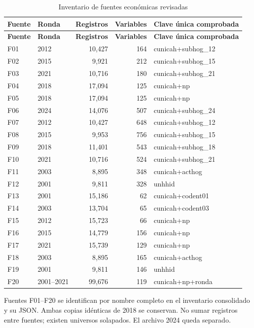 \begingroup\small\singlespacing
\setlength{\tabcolsep}{3pt}
\begin{longtable}{llrrp{4.4cm}}
\caption{Inventario de fuentes económicas revisadas}\label{tab:pensiones_fuentes}\\
\toprule \textbf{Fuente} & \textbf{Ronda} & \textbf{Registros} & \textbf{Variables} & \textbf{Clave única comprobada} \\
\midrule\endfirsthead
\toprule \textbf{Fuente} & \textbf{Ronda} & \textbf{Registros} & \textbf{Variables} & \textbf{Clave única comprobada} \\
\midrule\endhead\bottomrule\endfoot
F01 & 2012 & 10,427 & 164 & cunicah+subhog\_12 \\
F02 & 2015 & 9,921 & 212 & cunicah+subhog\_15 \\
F03 & 2021 & 10,716 & 180 & cunicah+subhog\_21 \\
F04 & 2018 & 17,094 & 125 & cunicah+np \\
F05 & 2018 & 17,094 & 125 & cunicah+np \\
F06 & 2024 & 14,076 & 507 & cunicah+subhog\_24 \\
F07 & 2012 & 10,427 & 648 & cunicah+subhog\_12 \\
F08 & 2015 & 9,953 & 756 & cunicah+subhog\_15 \\
F09 & 2018 & 11,401 & 543 & cunicah+subhog\_18 \\
F10 & 2021 & 10,716 & 524 & cunicah+subhog\_21 \\
F11 & 2003 & 8,895 & 348 & cunicah+acthog \\
F12 & 2001 & 9,811 & 328 & unhhid \\
F13 & 2001 & 15,186 & 62 & cunicah+codent01 \\
F14 & 2003 & 13,704 & 65 & cunicah+codent03 \\
F15 & 2012 & 15,723 & 66 & cunicah+np \\
F16 & 2015 & 14,779 & 156 & cunicah+np \\
F17 & 2021 & 15,739 & 129 & cunicah+np \\
F18 & 2003 & 8,895 & 165 & cunicah+acthog \\
F19 & 2001 & 9,811 & 146 & unhhid \\
F20 & 2001--2021 & 99,676 & 119 & cunicah+np+ronda \\
\end{longtable}
\noindent\footnotesize Fuentes F01--F20 se identifican por nombre completo en el inventario consolidado y su JSON. Ambas copias idénticas de 2018 se conservan. No sumar registros entre fuentes; existen universos solapados. El archivo 2024 queda separado.\par
\endgroup

